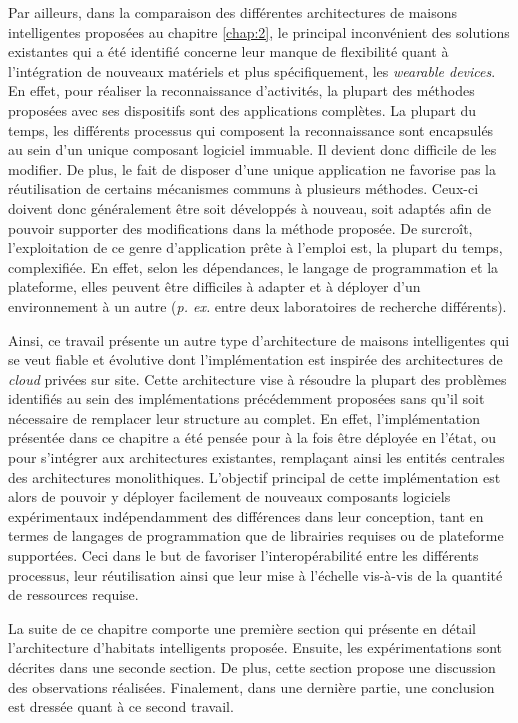 Par ailleurs, dans la comparaison des différentes architectures de maisons intelligentes proposées au chapitre \ref{chap:2}, le principal inconvénient des solutions existantes qui a été identifié concerne leur manque de flexibilité quant à l'intégration de nouveaux matériels et plus spécifiquement, les \textit{wearable devices}. En effet, pour réaliser la reconnaissance d'activités, la plupart des méthodes proposées avec ses dispositifs sont des applications complètes. La plupart du temps, les différents processus qui composent la reconnaissance sont encapsulés au sein d'un unique composant logiciel immuable. Il devient donc difficile de les modifier. De plus, le fait de disposer d'une unique application ne favorise pas la réutilisation de certains mécanismes communs à plusieurs méthodes. Ceux-ci doivent donc généralement être soit développés à nouveau, soit adaptés afin de pouvoir supporter des modifications dans la méthode proposée. De surcroît, l'exploitation de ce genre d'application \og prête à l'emploi \fg est, la plupart du temps, complexifiée. En effet, selon les dépendances, le langage de programmation et la plateforme, elles peuvent être difficiles à adapter et à déployer d'un environnement à un autre (\textit{p. ex.} entre deux laboratoires de recherche différents).

Ainsi, ce travail présente un autre type d'architecture de maisons intelligentes qui se veut fiable et évolutive dont l'implémentation est inspirée des architectures de \textit{cloud} privées sur site. Cette architecture vise à résoudre la plupart des problèmes identifiés au sein des implémentations précédemment proposées sans qu'il soit nécessaire de remplacer leur structure au complet. En effet, l'implémentation présentée dans ce chapitre a été pensée pour à la fois être déployée en l'état, ou pour s'intégrer aux architectures existantes, remplaçant ainsi les entités centrales des architectures monolithiques. L'objectif principal de cette implémentation est alors de pouvoir y déployer facilement de nouveaux composants logiciels expérimentaux indépendamment des différences dans leur conception, tant en termes de langages de programmation que de librairies requises ou de plateforme supportées. Ceci dans le but de favoriser l'interopérabilité entre les différents processus, leur réutilisation ainsi que leur mise à l'échelle vis-à-vis de la quantité de ressources requise.

La suite de ce chapitre comporte une première section qui présente en détail l'architecture d'habitats intelligents proposée. Ensuite, les expérimentations sont décrites dans une seconde section. De plus, cette section propose une discussion des observations réalisées. Finalement, dans une dernière partie, une conclusion est dressée quant à ce second travail.

